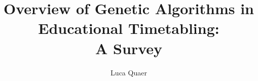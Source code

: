 \documentclass[sigconf]{acmart}
\begin{document}
\title[Overview of Genetic Algorithms in Educational Timetabling: A Survey]{
  Overview of Genetic Algorithms in Educational Timetabling:\\A Survey
}

\author{Luca Quaer}






\end{document}
